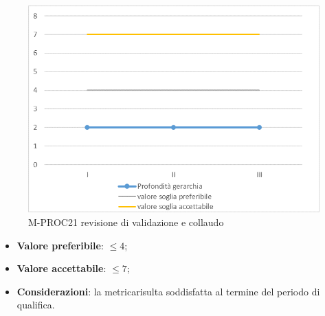 \begin{figure}[H] 	
	\includegraphics[width=\linewidth]{./img/grafici/RA21.png}	
	\caption{M-PROC21 revisione di validazione e collaudo}	
\end{figure}
\begin{itemize}
	\item \textbf{Valore preferibile}: $\le 4$;
	\item \textbf{Valore accettabile}: $\le 7$;
	\item \textbf{Considerazioni}: la metrica\glosp risulta soddisfatta al termine del periodo di qualifica.
\end{itemize}

